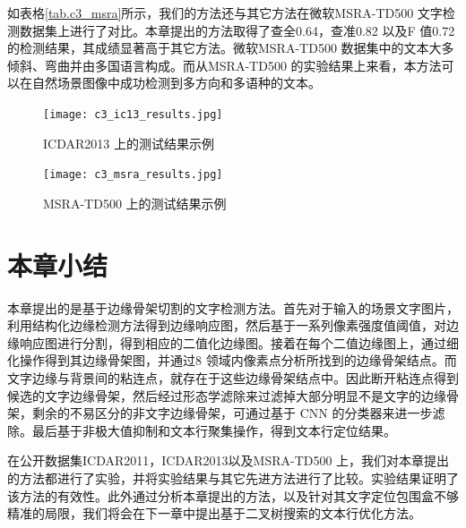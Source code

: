        如表格\ref{tab.c3_msra}所示，我们的方法还与其它方法在微软MSRA-TD500 文字检测数据集上进行了对比。本章提出的方法取得了查全0.64，查准0.82 以及F 值0.72 的检测结果，其成绩显著高于其它方法。微软MSRA-TD500 数据集中的文本大多倾斜、弯曲并由多国语言构成。而从MSRA-TD500 的实验结果上来看，本方法可以在自然场景图像中成功检测到多方向和多语种的文本。

        \begin{figure}[!h]
        \centering
        \texttt{[image: c3\_ic13\_results.jpg]}
        \caption{ICDAR2013 上的测试结果示例}
        \label{fig.c3_ic13_results}
        \end{figure}

        \begin{figure}[!h]
        \centering
        \texttt{[image: c3\_msra\_results.jpg]}
        \caption{MSRA-TD500 上的测试结果示例}
        \label{fig.c3_msra_results}
        \end{figure}

    \section{本章小结}

    本章提出的是基于边缘骨架切割的文字检测方法。首先对于输入的场景文字图片，利用结构化边缘检测方法得到边缘响应图，然后基于一系列像素强度值阈值，对边缘响应图进行分割，得到相应的二值化边缘图。接着在每个二值边缘图上，通过细化操作得到其边缘骨架图，并通过8 领域内像素点分析所找到的边缘骨架结点。而文字边缘与背景间的粘连点，就存在于这些边缘骨架结点中。因此断开粘连点得到候选的文字边缘骨架，然后经过形态学滤除来过滤掉大部分明显不是文字的边缘骨架，剩余的不易区分的非文字边缘骨架，可通过基于 CNN 的分类器来进一步滤除。最后基于非极大值抑制和文本行聚集操作，得到文本行定位结果。

    在公开数据集ICDAR2011，ICDAR2013以及MSRA-TD500 上，我们对本章提出的方法都进行了实验，并将实验结果与其它先进方法进行了比较。实验结果证明了该方法的有效性。此外通过分析本章提出的方法，以及针对其文字定位包围盒不够精准的局限，我们将会在下一章中提出基于二叉树搜索的文本行优化方法。


